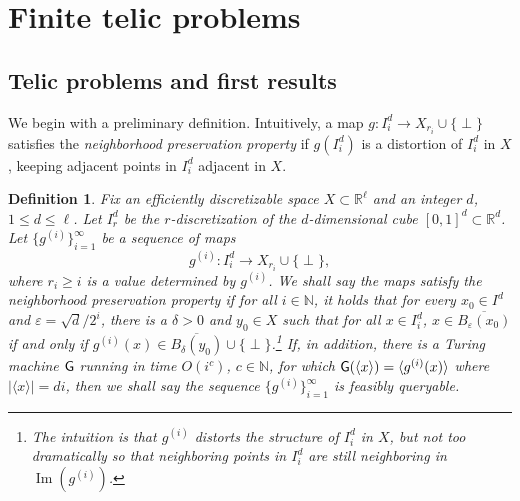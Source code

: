 \documentclass{amsart}
\theoremstyle{theorem}
\newtheorem{definition}[theorem]{Definition}
\theoremstyle{remark}
\numberwithin{equation}{section}
\DeclareMathOperator{\image}{Im}
\newcommand{\NN}{\mathbb{N}}
\newcommand{\RR}{\mathbb{R}}
\newcommand{\ccG}{\textsf{\upshape G}}
\begin{document}
\section{Finite telic problems}\label{secTelic}

\subsection{Telic problems and first results}

We begin with a preliminary definition. Intuitively, a map $g:I^d_i\rightarrow X_{r_i}\cup \{\perp\}$ satisfies the \emph{neighborhood preservation property} if $g(I^d_i)$ is a distortion of $I^d_i$ in $X$, keeping adjacent points in $I^d_i$ adjacent in $X$.

\begin{definition}\label{defFeasibleQuery}
Fix an efficiently discretizable space $X \subset \mathbb{R}^\ell$ and an integer $d$, $1 \leq d \leq \ell$. Let $I_r^d$ be the $r$-discretization of the $d$-dimensional cube $[0,1]^d \subset \RR^d$.
Let $\{g^{(i)}\}_{i=1}^\infty$ be a sequence of maps
\[
g^{(i)}:I^d_i\rightarrow X_{r_i} \cup \{\perp\},
\]
where $r_i\geq i$ is a value determined by $g^{(i)}$.
We shall say the maps satisfy the \emph{neighborhood preservation} property if for all $i \in \NN$, it holds that for every $x_0 \in I^d$ and $\varepsilon=\sqrt{d}/2^{i}$, there is a $\delta > 0$ and $y_0 \in X$ such that for all $x\in I_i^d $, $x \in \overline{B_\varepsilon(x_0)}$ if and only if $g^{(i)}(x) \in \overline{B_\delta(y_0)} \cup \{\perp\}$.\footnote{The intuition is that $g^{(i)}$ distorts the structure of $I_i^d$ in $X$, but not too dramatically so that neighboring points in $I_i^d$ are still neighboring in $\image(g^{(i)})$.}
If, in addition, there is a Turing machine $\ccG$ running in time $O(i^c)$, $c \in \NN$, for which $\ccG(\langle x\rangle) = \langle g^{(i)}(x)\rangle$ where $|\langle x\rangle|=di$, then we shall say the sequence $\{g^{(i)}\}_{i=1}^\infty$ is \emph{feasibly queryable}.
\end{definition}
\end{document}
